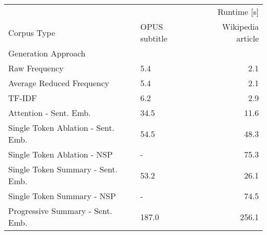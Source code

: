 \begin{tabular}{llr}
\toprule
 & \multicolumn{2}{r}{Runtime [s]} \\
Corpus Type & OPUS subtitle & Wikipedia article \\
Generation Approach &  &  \\
\midrule
Raw Frequency & 5.4 & 2.1 \\
Average Reduced Frequency & 5.4 & 2.1 \\
TF-IDF & 6.2 & 2.9 \\
Attention - Sent. Emb. & 34.5 & 11.6 \\
Single Token Ablation - Sent. Emb. & 54.5 & 48.3 \\
Single Token Ablation - NSP & - & 75.3 \\
Single Token Summary - Sent. Emb. & 53.2 & 26.1 \\
Single Token Summary - NSP & - & 74.5 \\
Progressive Summary - Sent. Emb. & 187.0 & 256.1 \\
\bottomrule
\end{tabular}
